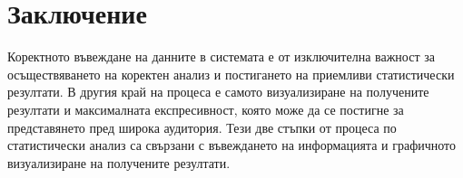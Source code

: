 \section*{Заключение}

Коректното въвеждане на данните в системата е от изключителна важност за осъществяването на коректен анализ и постигането на приемливи статистически резултати. В другия край на процеса е самото визуализиране на получените резултати и максималната експресивност, която може да се постигне за представянето пред широка аудитория. Тези две стъпки от процеса по статистически анализ са свързани с въвеждането на информацията и графичното визуализиране на получените резултати. 

